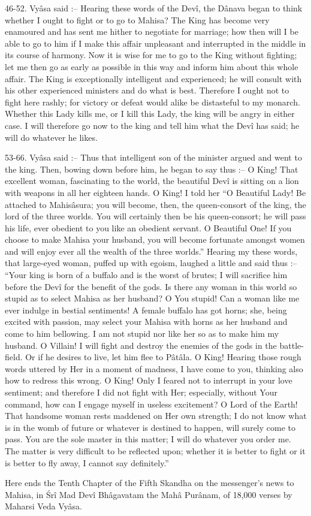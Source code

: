 46-52. Vy\^asa said :-- Hearing these words of the Dev\^i, the D\^anava began to think whether I ought to fight or to go to Mahisa? The King has become very enamoured and has sent me hither to negotiate for marriage; how then will I be able to go to him if I make this affair unpleasant and interrupted in the middle in its course of harmony. Now it is wise for me to go to the King without fighting; let me then go as early as possible in this way and inform him about this whole affair. The King is exceptionally intelligent and experienced; he will consult with his other experienced ministers and do what is best. Therefore I ought not to fight here rashly; for victory or defeat would alike be distasteful to my monarch. Whether this Lady kills me, or I kill this Lady, the king will be angry in either case. I will therefore go now to the king and tell him what the Dev\^i has said; he will do whatever he likes.

53-66. Vy\^asa said :-- Thus that intelligent son of the minister argued and went to the king. Then, bowing down before him, he began to say thus :-- O King! That excellent woman, fascinating to the world, the beautiful Dev\^i is sitting on a lion with weapons in all her eighteen hands. O King! I told her ``O Beautiful Lady! Be attached to Mahis\^asura; you will become, then, the queen-consort of the king, the lord of the three worlds. You will certainly then be his queen-consort; he will pass his life, ever obedient to you like an obedient servant. O Beautiful One! If you choose to make Mahisa your husband, you will become fortunate amongst women and will enjoy ever all the wealth of the three worlds.'' Hearing my these words, that large-eyed woman, puffed up with egoism, laughed a little and said thus :-- ``Your king is born of a buffalo and is the worst of brutes; I will sacrifice him before the Dev\^i for the benefit of the gods. Is there any woman in this world so stupid as to select Mahisa as her husband? O You stupid! Can a woman like me ever indulge in bestial sentiments! A female buffalo has got horns; she, being excited with passion, may select your Mahisa with horns as her husband and come to him bellowing. I am not stupid nor like her so as to make him my husband. O Villain! I will fight and destroy the enemies of the gods in the battle-field. Or if he desires to live, let him flee to P\^at\^ala. O King! Hearing those rough words uttered by Her in a moment of madness, I have come to you, thinking also how to redress this wrong. O King! Only I feared not to interrupt in your love sentiment; and therefore I did not fight with Her; especially, without Your command, how can I engage myself in useless excitement? O Lord of the Earth! That handsome woman rests maddened on Her own strength; I do not know what is in the womb of future or whatever is destined to happen, will surely come to pass. You are the sole master in this matter; I will do whatever you order me. The matter is very difficult to be reflected upon; whether it is better to fight or it is better to fly away, I cannot say definitely.''

Here ends the Tenth Chapter of the Fifth Skandha on the messenger's news to Mahisa, in \'Sr\^i Mad Dev\^i Bh\^agavatam the Mah\^a Pur\^anam, of 18,000 verses by Maharsi Veda Vy\^asa.